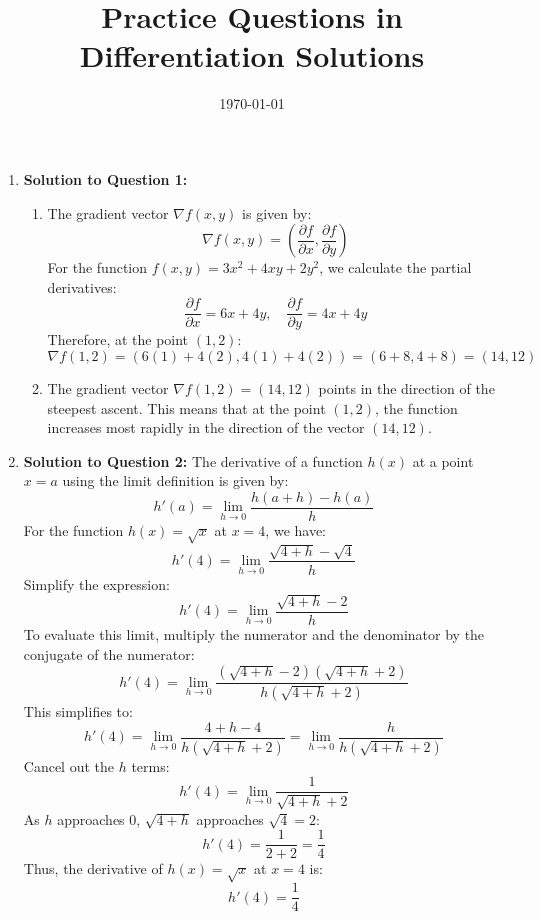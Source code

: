 \documentclass{article}
\title{Practice Questions in Differentiation Solutions}
\author{}
\date{\today}
\begin{document}
\maketitle
\thispagestyle{fancy}



\begin{enumerate}[itemsep=20pt]

    \item \textbf{Solution to Question 1:}
    \begin{enumerate}[label=(\alph*), itemsep=10pt]
        \item The gradient vector \( \nabla f(x, y) \) is given by:
        \[
        \nabla f(x, y) = \left( \frac{\partial f}{\partial x}, \frac{\partial f}{\partial y} \right)
        \]
        For the function \( f(x, y) = 3x^2 + 4xy + 2y^2 \), we calculate the partial derivatives:
        \[
        \frac{\partial f}{\partial x} = 6x + 4y, \quad \frac{\partial f}{\partial y} = 4x + 4y
        \]
        Therefore, at the point \( (1, 2) \):
        \[
        \nabla f(1, 2) = \left( 6(1) + 4(2), 4(1) + 4(2) \right) = \left( 6 + 8, 4 + 8 \right) = (14, 12)
        \]
        
        \item The gradient vector \( \nabla f(1, 2) = (14, 12) \) points in the direction of the steepest ascent. This means that at the point \( (1, 2) \), the function increases most rapidly in the direction of the vector \( (14, 12) \).
    \end{enumerate}

    \item \textbf{Solution to Question 2:}
    The derivative of a function \( h(x) \) at a point \( x = a \) using the limit definition is given by:
\[
h'(a) = \lim_{h \to 0} \frac{h(a+h) - h(a)}{h}
\]
For the function \( h(x) = \sqrt{x} \) at \( x = 4 \), we have:
\[
h'(4) = \lim_{h \to 0} \frac{\sqrt{4+h} - \sqrt{4}}{h}
\]
Simplify the expression:
\[
h'(4) = \lim_{h \to 0} \frac{\sqrt{4+h} - 2}{h}
\]
To evaluate this limit, multiply the numerator and the denominator by the conjugate of the numerator:
\[
h'(4) = \lim_{h \to 0} \frac{(\sqrt{4+h} - 2)(\sqrt{4+h} + 2)}{h(\sqrt{4+h} + 2)}
\]
This simplifies to:
\[
h'(4) = \lim_{h \to 0} \frac{4 + h - 4}{h(\sqrt{4+h} + 2)} = \lim_{h \to 0} \frac{h}{h(\sqrt{4+h} + 2)}
\]
Cancel out the \( h \) terms:
\[
h'(4) = \lim_{h \to 0} \frac{1}{\sqrt{4+h} + 2}
\]
As \( h \) approaches 0, \( \sqrt{4+h} \) approaches \( \sqrt{4} = 2 \):
\[
h'(4) = \frac{1}{2 + 2} = \frac{1}{4}
\]
Thus, the derivative of \( h(x) = \sqrt{x} \) at \( x = 4 \) is:
\[
h'(4) = \frac{1}{4}
\]


\end{enumerate}
\end{document}
